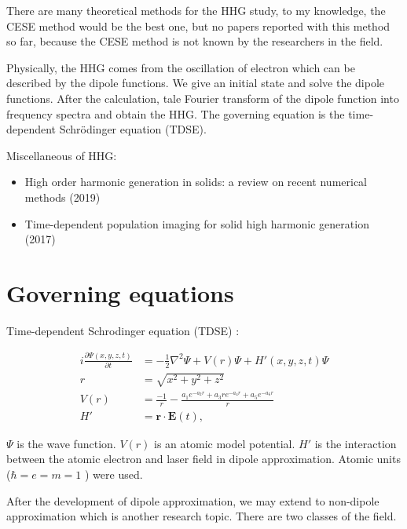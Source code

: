 \documentclass{isildur}
\begin{document}
There are many theoretical methods for the HHG study, to my knowledge, the CESE
method would be the best one, but no papers reported with this method so far,
because the CESE method is not known by the researchers in the field.

Physically, the HHG comes from the oscillation of electron which can be
described by the dipole functions. We give an initial state and solve the
dipole functions.  After the calculation, tale Fourier transform of the dipole
function into frequency spectra and obtain the HHG.  The governing equation is
the time-dependent Schrödinger equation (TDSE).

Miscellaneous of HHG:
%
\begin{itemize}

  \item High order harmonic generation in solids: a review on recent numerical
  methods (2019) \cite{yu_high_2019}

  \item Time-dependent population imaging for solid high harmonic generation
  (2017) \cite{liu_time-dependent_2017}

\end{itemize}

\chapter{Governing equations}
\label{c:goveq}

Time-dependent Schrodinger equation (TDSE) \cite{briggs_derivation_2007}:

\begin{align}
  i\frac{\partial \Psi(x, y, z, t)}{\partial t}
    &= -\frac{1}{2}\nabla^2\Psi + V(r)\Psi + H'(x, y, z, t)\Psi
    \label{e:tdse} \\
  r &= \sqrt{x^2+y^2+z^2} \nonumber \\
  V(r) &= \frac{-1}{r}
        - \frac{a_1e^{-a_2r}+a_3re^{-a_4r}+a_5e^{-a_6r}}{r} \\
  H' &= \mathbf{r}\cdot \mathbf{E}(t),
\end{align}

$\Psi$ is the wave function.  $V(r)$ is an atomic model potential.  $H'$ is the
interaction between the atomic electron and laser field in dipole
approximation. Atomic units ($\hbar=e=m=1$ ) were used.

After the development of dipole approximation, we may extend to non-dipole
approximation which is another research topic.  There are two classes of the
field.
\end{document}

